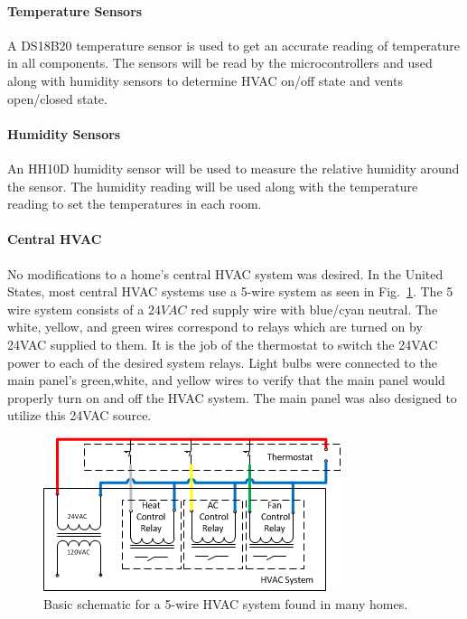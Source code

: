 \paragraph{Temperature Sensors}
\label{temp_sensors}
A DS18B20 temperature sensor is used to get an accurate reading of temperature in all components. The sensors will be read by the microcontrollers and used along with humidity sensors to determine HVAC on/off state and vents open/closed state.
\paragraph{Humidity Sensors}
\label{humid_sensors}
An HH10D humidity sensor will be used to measure the relative humidity around the sensor.  The humidity reading will be used along with the temperature reading to set the temperatures in each room.

\paragraph{Central HVAC}
No modifications to a home's central HVAC system was desired. In the United States, most central HVAC systems use a 5-wire system as seen in Fig.~\ref{fig:5wire}.  The 5 wire system consists of a $24VAC$ red supply wire with blue/cyan neutral.  The white, yellow, and green wires correspond to relays which are turned on by 24VAC supplied to them. It is the job of the thermostat to switch the 24VAC power to each of the desired system relays.  Light bulbs were connected to the main panel's green,white, and yellow wires to verify that the main panel would properly turn on and off the HVAC system.  The main panel was also designed to utilize this 24VAC source.

\begin{figure}
\centering
\includegraphics[width=.99\textwidth]{5wire.png}
\caption{Basic schematic for a 5-wire HVAC system found in many homes.}
\label{fig:5wire}
\end{figure}

